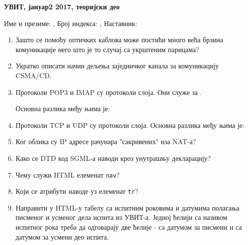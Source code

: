\documentclass[a4paper]{slides}
\begin{document}
\begin{center}
\textbf{УВИТ, јануар2 2017, теоријски део}  
\end{center}
Име и презиме: \hrulefill, Број индекса: \hrulefill, Наставник: \hrulefill
\begin{enumerate}

\item Зашто се помоћу оптичких каблова може постићи много већа брзина комуникације него што је то случај 
са укрштеним парицама? \hrulefill

\hrulefill


\item Укратко описати начин дељења заједничког канала за комуникацију CSMA/CD. \hrulefill

\hrulefill

\hrulefill


\item Протоколи POP3 и IMAP су протоколи \hrulefill слоја. Они служе за  \hrulefill. 

Основна разлика међу њима је:\hrulefill

\hrulefill

\item Протоколи TCP и UDP су протоколи \hrulefill слоја. Основна разлика међу њима је:

\hrulefill


\item Ког облика су IP адресе рачунара "сакривених" иза NAT-а? \hrulefill

\hrulefill


\item Како се DTD код SGML-а наводи кроз унутрашњу декларацију? \hrulefill

\hrulefill

\hrulefill


\item Чему служи HTML елеменат \verb|nav|? \hrulefill

\hrulefill

\item Који се атрибути наводе уз елеменат \verb|tr|? \hrulefill

\hrulefill


\item Направити у HTML-у табелу са испитним роковима и датумима полагања писменог и усменог дела испита из УВИТ-а. 
Једној ћелији са називом испитног рока треба да одговарају две ћелије - са датумом за писмени и са датумом 
за усмени део испита. \hrulefill


\end{enumerate}
\end{document}
